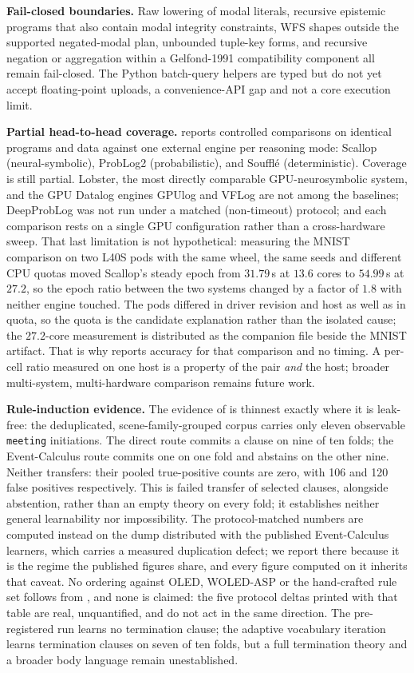 \textbf{Fail-closed boundaries.} Raw lowering of modal literals, recursive epistemic programs that also contain modal integrity constraints, WFS shapes outside the supported negated-modal plan, unbounded tuple-key forms, and recursive negation or aggregation within a Gelfond-1991 compatibility component all remain fail-closed. The Python batch-query helpers are typed but do not yet accept floating-point uploads, a convenience-API gap and not a core execution limit.

\textbf{Partial head-to-head coverage.}  reports controlled comparisons on identical programs and data against one external engine per reasoning mode: Scallop (neural-symbolic), ProbLog2 (probabilistic), and Soufflé (deterministic). Coverage is still partial. Lobster, the most directly comparable GPU-neurosymbolic system, and the GPU Datalog engines GPUlog and VFLog are not among the baselines; DeepProbLog was not run under a matched (non-timeout) protocol; and each comparison rests on a single GPU configuration rather than a cross-hardware sweep. That last limitation is not hypothetical: measuring the MNIST comparison on two L40S pods with the same wheel, the same seeds and different CPU quotas moved Scallop's steady epoch from $31.79$\,s at $13.6$ cores to $54.99$\,s at $27.2$, so the epoch ratio between the two systems changed by a factor of $1.8$ with neither engine touched. The pods differed in driver revision and host as well as in quota, so the quota is the candidate explanation rather than the isolated cause; the $27.2$-core measurement is distributed as the companion file beside the MNIST artifact. That is why  reports accuracy for that comparison and no timing. A per-cell ratio measured on one host is a property of the pair \emph{and} the host; broader multi-system, multi-hardware comparison remains future work.

\textbf{Rule-induction evidence.} The evidence of  is thinnest exactly where it is leak-free: the deduplicated, scene-family-grouped corpus carries only eleven observable \texttt{meeting} initiations. The direct route commits a clause on nine of ten folds; the Event-Calculus route commits one on one fold and abstains on the other nine. Neither transfers: their pooled true-positive counts are zero, with 106 and 120 false positives respectively. This is failed transfer of selected clauses, alongside abstention, rather than an empty theory on every fold; it establishes neither general learnability nor impossibility. The protocol-matched numbers are computed instead on the dump distributed with the published Event-Calculus learners, which carries a measured duplication defect; we report there because it is the regime the published figures share, and every figure computed on it inherits that caveat. No ordering against OLED, WOLED-ASP or the hand-crafted rule set follows from , and none is claimed: the five protocol deltas printed with that table are real, unquantified, and do not act in the same direction. The pre-registered run learns no termination clause; the adaptive vocabulary iteration learns termination clauses on seven of ten folds, but a full termination theory and a broader body language remain unestablished.


